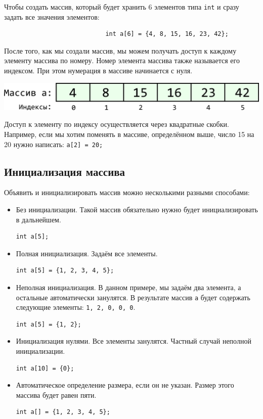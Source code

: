 \documentclass{article}
\begin{document}
\noindent Чтобы создать массив, который будет хранить 6 элементов типа \texttt{int} и сразу задать все значения элементов:
\begin{lstlisting}
                            int a[6] = {4, 8, 15, 16, 23, 42};
\end{lstlisting}

После того, как мы создали массив, мы можем получать доступ к каждому элементу массива по номеру. Номер элемента массива также называется его индексом. При этом нумерация в массиве начинается с нуля.
\begin{center}
\includegraphics[scale=0.8]{../images/array_indexes.png}
\end{center}
Доступ к элементу по индексу осуществляется через квадратные скобки. Например, если мы хотим поменять в массиве, определённом выше, число 15 на 20 нужно написать: \texttt{a[2] = 20;}


\subsection*{Инициализация массива}
Объявить и инициализировать массив можно несколькими разными способами:
\begin{itemize}
\item Без инициализации. Такой массив обязательно нужно будет инициализировать в дальнейшем.
\begin{lstlisting}
int a[5]; 
\end{lstlisting}

\item Полная инициализация. Задаём все элементы.
\begin{lstlisting}
int a[5] = {1, 2, 3, 4, 5};
\end{lstlisting}

\item Неполная инициализация. В данном примере, мы задаём два элемента, а остальные автоматически занулятся. В результате массив \texttt{a} будет содержать следующие элементы: \texttt{1, 2, 0, 0, 0}. 
\begin{lstlisting}
int a[5] = {1, 2};
\end{lstlisting}

\item Инициализация нулями. Все элементы занулятся. Частный случай неполной инициализации.
\begin{lstlisting}
int a[10] = {0};
\end{lstlisting}

\item Автоматическое определение размера, если он не указан. Размер этого массива будет равен пяти.
\begin{lstlisting}
int a[] = {1, 2, 3, 4, 5};
\end{lstlisting}
\end{itemize}
\end{document}
